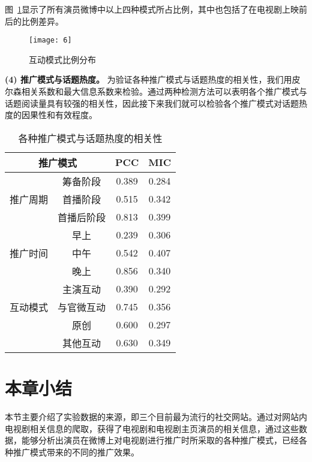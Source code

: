 图~\ref{inter3}显示了所有演员微博中以上四种模式所占比例，其中也包括了在电视剧上映前后的比例差异。

\begin{figure}[!htbp]
\centering
\texttt{[image: 6]}
\caption{互动模式比例分布}
\label{inter3}
\end{figure}

\textbf{(4) 推广模式与话题热度。}
为验证各种推广模式与话题热度的相关性，我们用皮尔森相关系数和最大信息系数来检验。通过两种检测方法可以表明各个推广模式与话题阅读量具有较强的相关性，因此接下来我们就可以检验各个推广模式对话题热度的因果性和有效程度。

\begin{table}[!htbp]
\centering
\caption{各种推广模式与话题热度的相关性}
\begin{tabular}{|c|c|c|c|} \hline
\multicolumn{2}{|c|}{推广模式}&PCC&MIC\\ \hline
\multirow{3}{*}{推广周期} & 筹备阶段&0.389&0.284\\%
&首播阶段&0.515&0.342\\%
&首播后阶段&0.813&0.399\\ \hline
\multirow{3}{*}{推广时间} &早上&0.239&0.306\\%
&中午&0.542&0.407\\%
&晚上&0.856&0.340\\ \hline
\multirow{3}{*}{互动模式} &主演互动&0.390&0.292\\%
&与官微互动&0.745&0.356\\%
&原创&0.600&0.297\\ 
&其他互动&0.630&0.349\\ 
\hline\end{tabular}
\end{table}

\section{本章小结}

本节主要介绍了实验数据的来源，即三个目前最为流行的社交网站。通过对网站内电视剧相关信息的爬取，获得了电视剧和电视剧主页演员的相关信息，通过这些数据，能够分析出演员在微博上对电视剧进行推广时所采取的各种推广模式，已经各种推广模式带来的不同的推广效果。




















































